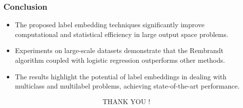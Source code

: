 \documentclass{beamer}
\begin{document}


\begin{frame}
\frametitle{Conclusion}
\begin{itemize}
    \item The proposed label embedding techniques significantly improve computational and statistical efficiency in large output space problems.
    \item Experiments on large-scale datasets demonstrate that the Rembrandt algorithm coupled with logistic regression outperforms other methods.
    \item The results highlight the potential of label embeddings in dealing with multiclass and multilabel problems, achieving state-of-the-art performance.
\end{itemize}
\end{frame}


\begin{frame}
\begin{align*}
    \text{THANK YOU !}
\end{align*}
\end{frame}
\end{document}
